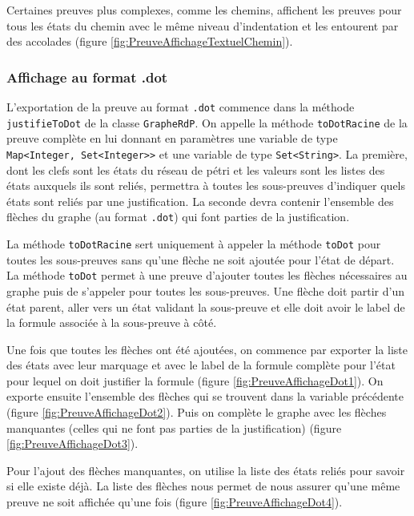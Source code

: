 \documentclass[dvipsnames]{report}
\begin{document}


Certaines preuves plus complexes, comme les chemins, affichent les preuves pour tous les états du chemin avec le même niveau d'indentation et les entourent par des accolades (figure \ref{fig:PreuveAffichageTextuelChemin}).



\subsubsection{Affichage au format .dot}

L'exportation de la preuve au format \texttt{.dot} commence dans la méthode \texttt{justifieToDot} de la classe \texttt{GrapheRdP}. On appelle la méthode \texttt{toDotRacine} de la preuve complète en lui donnant en paramètres une variable de type \texttt{Map<Integer, {Set<Integer>}>} et une variable de type \texttt{Set<String>}. La première, dont les clefs sont les états du réseau de pétri et les valeurs sont les listes des états auxquels ils sont reliés, permettra à toutes les sous-preuves d'indiquer quels états sont reliés par une justification. La seconde devra contenir l'ensemble des flèches du graphe (au format \texttt{.dot}) qui font parties de la justification.

La méthode \texttt{toDotRacine} sert uniquement à appeler la méthode \texttt{toDot} pour toutes les sous-preuves sans qu'une flèche ne soit ajoutée pour l'état de départ. La méthode \texttt{toDot} permet à une preuve d'ajouter toutes les flèches nécessaires au graphe puis de s'appeler pour toutes les sous-preuves. Une flèche doit partir d'un état parent, aller vers un état validant la sous-preuve et elle doit avoir le label de la formule associée à la sous-preuve à côté.

Une fois que toutes les flèches ont été ajoutées, on commence par exporter la liste des états avec leur marquage et avec le label de la formule complète pour l'état pour lequel on doit justifier la formule (figure \ref{fig:PreuveAffichageDot1}). On exporte ensuite l'ensemble des flèches qui se trouvent dans la variable précédente (figure \ref{fig:PreuveAffichageDot2}). Puis on complète le graphe avec les flèches manquantes (celles qui ne font pas parties de la justification) (figure \ref{fig:PreuveAffichageDot3}).



Pour l'ajout des flèches manquantes, on utilise la liste des états reliés pour savoir si elle existe déjà. La liste des flèches nous permet de nous assurer qu'une même preuve ne soit affichée qu'une fois (figure \ref{fig:PreuveAffichageDot4}).
\end{document}
